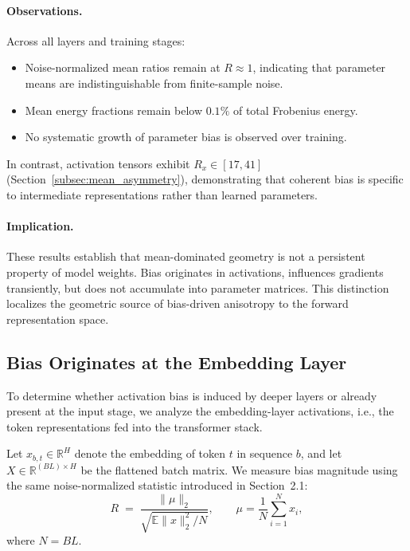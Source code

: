 \paragraph{Observations.}

Across all layers and training stages:

\begin{itemize}
\item Noise-normalized mean ratios remain at $R \approx 1$,
indicating that parameter means are indistinguishable from
finite-sample noise.
\item Mean energy fractions remain below $0.1\%$ of total Frobenius energy.
\item No systematic growth of parameter bias is observed over training.
\end{itemize}

In contrast, activation tensors exhibit
$R_x \in [17, 41]$ (Section~\ref{subsec:mean_asymmetry}),
demonstrating that coherent bias is specific to intermediate
representations rather than learned parameters.

\paragraph{Implication.}
These results establish that mean-dominated geometry is not
a persistent property of model weights.
Bias originates in activations, influences gradients transiently,
but does not accumulate into parameter matrices.
This distinction localizes the geometric source of bias-driven
anisotropy to the forward representation space.

\subsection{Bias Originates at the Embedding Layer}
\label{subsec:embedding_bias}

To determine whether activation bias is induced by deeper layers or
already present at the input stage, we analyze the embedding-layer
activations, i.e., the token representations fed into the transformer
stack.

Let $x_{b,t} \in \mathbb{R}^H$ denote the embedding of token $t$ in
sequence $b$, and let $X \in \mathbb{R}^{(B L)\times H}$ be the
flattened batch matrix.
We measure bias magnitude using the same noise-normalized statistic
introduced in Section~2.1:
\[
R \;=\;
\frac{\|\mu\|_2}
{\sqrt{\mathbb{E}\|x\|_2^2 / N}},
\qquad
\mu = \frac{1}{N}\sum_{i=1}^N x_i,
\]
where $N = B L$.

